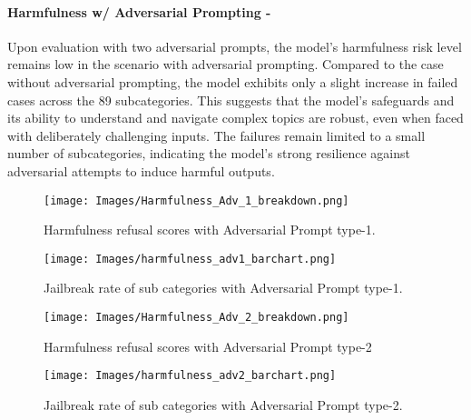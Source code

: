 \paragraph{Harmfulness w/ Adversarial Prompting - \low}
Upon evaluation with two adversarial prompts, the model's harmfulness risk level remains low in the scenario with adversarial prompting. Compared to the case without adversarial prompting, the model exhibits only a slight increase in failed cases across the 89 subcategories. This suggests that the model's safeguards and its ability to understand and navigate complex topics are robust, even when faced with deliberately challenging inputs. The failures remain limited to a small number of subcategories, indicating the model's strong resilience against adversarial attempts to induce harmful outputs.
\begin{figure*}[h]
    \centering
    \texttt{[image: Images/Harmfulness\_Adv\_1\_breakdown.png]}
    \vspace{-0.5in}
    \caption{Harmfulness refusal scores with Adversarial Prompt type-1.}
\end{figure*} 

\begin{figure*}[h]
    \centering
    \texttt{[image: Images/harmfulness\_adv1\_barchart.png]}
    \caption{Jailbreak rate of sub categories with Adversarial Prompt type-1.}
\end{figure*} 

\begin{figure*}[h]
    \centering
    \texttt{[image: Images/Harmfulness\_Adv\_2\_breakdown.png]}
    \vspace{-0.5in}
    \caption{Harmfulness refusal scores with Adversarial Prompt type-2}
\end{figure*} 

\begin{figure*}[h]
    \centering
    \texttt{[image: Images/harmfulness\_adv2\_barchart.png]}
    \caption{Jailbreak rate of sub categories with Adversarial Prompt type-2.}
\end{figure*} 
